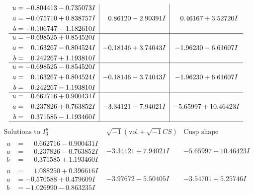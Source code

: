 \documentclass[1p]{elsarticle_modified}
\theoremstyle{definition}
\newcommand{\I}{\sqrt{-1}}
\begin{document}
$$\begin{array}{c|c|c}
\begin{aligned}
u &= -0.804413 - 0.735073 I \\
a &= -0.075710 + 0.838757 I \\
b &= -0.106747 - 1.182610 I\end{aligned}
 & \phantom{-}0.86120 - 2.90391 I & \phantom{-}0.46167 + 3.52720 I \\ \hline\begin{aligned}
u &= -0.698525 + 0.854520 I \\
a &= \phantom{-}0.163267 - 0.804524 I \\
b &= \phantom{-}0.242267 + 1.193810 I\end{aligned}
 & -0.18146 + 3.74043 I & -1.96230 - 6.61607 I \\ \hline\begin{aligned}
u &= -0.698525 - 0.854520 I \\
a &= \phantom{-}0.163267 + 0.804524 I \\
b &= \phantom{-}0.242267 - 1.193810 I\end{aligned}
 & -0.18146 - 3.74043 I & -1.96230 + 6.61607 I \\ \hline\begin{aligned}
u &= \phantom{-}0.662716 + 0.900431 I \\
a &= \phantom{-}0.237826 + 0.763852 I \\
b &= \phantom{-}0.371585 - 1.193460 I\end{aligned}
 & -3.34121 - 7.94021 I & -5.65997 + 10.46423 I\\
 \hline 
 \end{array}$$\newpage$$\begin{array}{c|c|c}  
\text{Solutions to }I^u_{3}& \I (\text{vol} + \sqrt{-1}CS) & \text{Cusp shape}\\
 \hline 
\begin{aligned}
u &= \phantom{-}0.662716 - 0.900431 I \\
a &= \phantom{-}0.237826 - 0.763852 I \\
b &= \phantom{-}0.371585 + 1.193460 I\end{aligned}
 & -3.34121 + 7.94021 I & -5.65997 - 10.46423 I \\ \hline\begin{aligned}
u &= \phantom{-}1.088250 + 0.396616 I \\
a &= -0.570588 + 0.479609 I \\
b &= -1.026990 - 0.863235 I\end{aligned}
 & -3.97672 - 5.50405 I & -3.54701 + 5.25746 I \\ \hline\begin{aligned}

\end{aligned}
\end{array}$$
\end{document}
